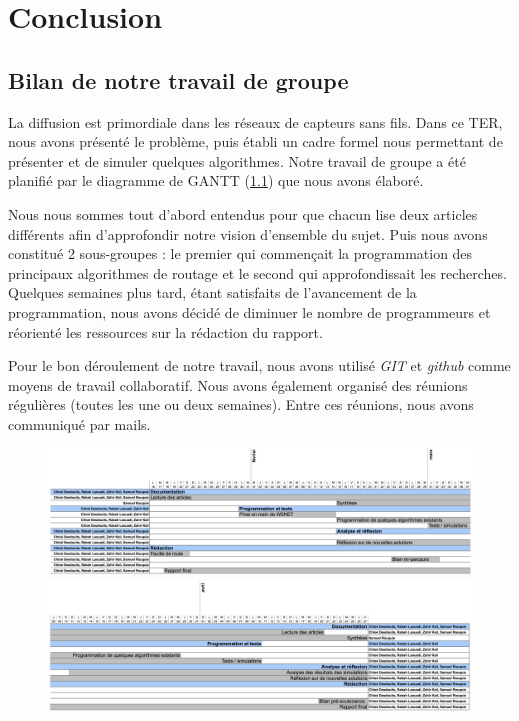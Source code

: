 
\chapter{Conclusion}\label{conclusion}

\section{Bilan de notre travail de groupe}
La diffusion est primordiale dans les réseaux de capteurs sans fils. Dans ce TER, nous avons présenté le problème, puis établi un cadre formel nous permettant de présenter et de simuler quelques algorithmes. Notre travail de groupe a été planifié par le diagramme de GANTT (\ref{GANTT}) que nous avons élaboré.

Nous nous sommes tout d'abord entendus pour que chacun lise deux articles différents afin d'approfondir notre vision d'ensemble du sujet. Puis nous avons constitué 2 sous-groupes : le premier qui commençait la programmation des principaux algorithmes de routage et le second qui approfondissait les recherches. Quelques semaines plus tard, étant satisfaits de l'avancement de la programmation, nous avons décidé de diminuer le nombre de programmeurs et réorienté les ressources sur la rédaction du rapport.

Pour le bon déroulement de notre travail, nous avons utilisé \emph{GIT} et \emph{github} comme moyens de travail collaboratif. Nous avons également organisé des réunions régulières (toutes les une ou deux semaines). Entre ces réunions, nous avons communiqué par mails.


\begin{landscape}
\begin{figure}
\centering
\includegraphics[scale=0.98]{Conclusion/diagramme}
\includegraphics[scale=0.98]{Conclusion/diagramme2}
\label{GANTT}
\end{figure}
\end{landscape}

